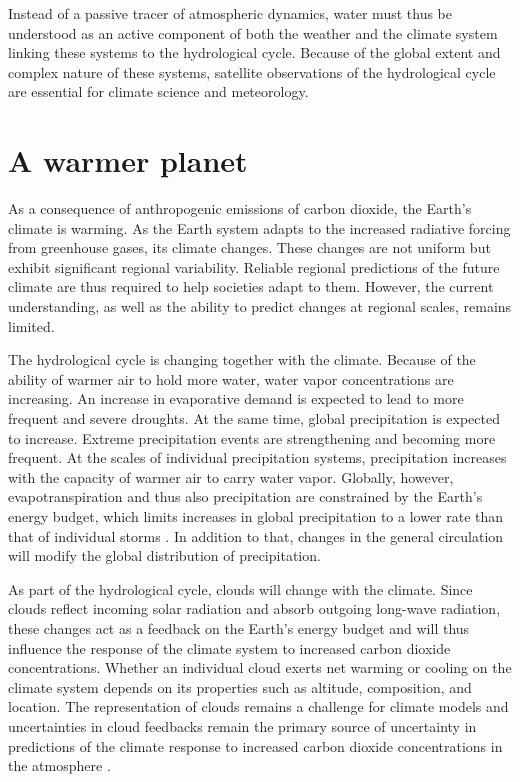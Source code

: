 Instead of a passive tracer of atmospheric dynamics, water must thus be
understood as an active component of both the weather and the climate system
linking these systems to the hydrological cycle. Because of the global
extent and complex nature of these systems, satellite observations of the
hydrological cycle are essential for climate science and meteorology.


\section{A warmer planet}

As a consequence of anthropogenic emissions of carbon dioxide, the Earth's
 climate is warming. As the Earth system adapts to the increased radiative
 forcing from greenhouse gases, its climate changes. These changes are not
 uniform but exhibit significant regional variability. Reliable regional
 predictions of the future climate are thus required to help societies adapt to
 them. However, the current understanding, as well as the ability to predict
 changes at regional scales, remains limited.

The hydrological cycle is changing together with the climate. Because of the
ability of warmer air to hold more water, water vapor concentrations are
increasing. An increase in evaporative demand is expected to lead to more frequent
and severe droughts. At the same time, global precipitation is expected to
increase. Extreme precipitation events are strengthening and becoming more
frequent. At the scales of individual precipitation systems, precipitation
increases with the capacity of warmer air to carry water vapor. Globally,
however, evapotranspiration and thus also precipitation are constrained by the
Earth's energy budget, which limits increases in global precipitation to a lower
rate than that of individual storms \citep{collins13}. In addition to that,
changes in the general circulation will modify the global distribution of
precipitation.

As part of the hydrological cycle, clouds will change with the climate. Since
clouds reflect incoming solar radiation and  absorb outgoing long-wave
radiation, these changes act as a feedback on the Earth's energy budget and
will thus influence the response of the climate system to increased carbon dioxide
concentrations. Whether an individual cloud exerts  net warming or cooling
 on the climate system depends on its properties such as altitude,
 composition, and  location. The representation of clouds remains a
challenge for climate models and uncertainties in cloud feedbacks
remain the primary source of uncertainty in predictions of the climate response
to increased carbon dioxide concentrations in the atmosphere \citep{zelinka20}.

